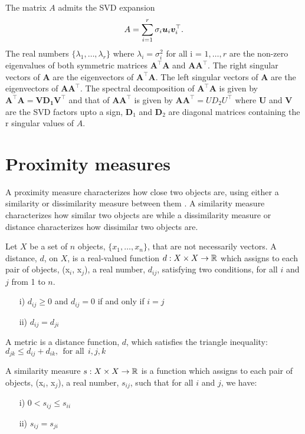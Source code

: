 The matrix $A$ admits the SVD expansion 
\[
A = \sum_{i=1}^{r} \sigma_{i} \boldsymbol{u}_{i} \boldsymbol{v}_{i}^{\top}.
\]
The real numbers $\{\lambda_{1}, \ldots, \lambda_{r}\}$ where $\lambda_{i} = \sigma_{i}^{2}$ for all i = $1 , \ldots, r$ are the non-zero eigenvalues of both symmetric matrices $\bm{A^{\top}A}$ and $\bm{AA^{\top}}.$ The right singular vectors of $\bm{A}$ are the eigenvectors of $\bm{A^{\top}A}.$ The left singular vectors of $\bm{A}$ are the eigenvectors of $\bm{AA^{\top}}.$ The spectral decomposition of $\bm{A^{\top}A}$ is given by $\bm{A^{\top}A  = V D_{1} V^{\top}}$ and that of  $\bm{AA^{\top}}$ is given by  $\bm{AA^{\top}} = U D_{2} U^{\top}$ where $\bm{U}$ and $\bm{V}$ are the SVD factors upto a sign, $\bm{D}_{1}$ and $\bm{D}_{2}$ are diagonal matrices containing the r singular values of $A$.


\section{Proximity measures}\label{proximity}

\begin{Def}
A proximity measure characterizes how close two objects are, using
either a similarity or dissimilarity measure between them \cite{CoxT2000}.
A similarity measure characterizes how similar two objects are while
a dissimilarity measure or distance characterizes how dissimilar two objects are.
\end{Def}


\begin{Def}\label{distance}
Let $X$ be a set of $n$ objects, $\{x_{1}, \dots, x_{n}\}$, that are not necessarily vectors. A distance, $d$, on $X$, is a real-valued  function
$d: X \times X \rightarrow  \operatorname{\mathbb{R}}$ which assigns to each pair of objects, (x$_{i}$, x$_{j}$), a real number, $d_{ij}$, satisfying two conditions, for all $i$ and $j$ from 1 to $n$. 
\begin{itemize}
\item [i)] $d_{ij} \geq 0$ and $d_{ij} = 0$ if and only if $i=j$
\item [ii)] $d_{ij} = d_{ji}$
\end{itemize}
\end{Def}


A metric is a distance function, $d$, which satisfies the triangle inequality:
$d_{jk} \leq d_{ij} + d_{ik}, \ \ \text{for all}\ \ i,j,k$ 


\begin{Def}
A similarity measure $s: X \times X \rightarrow  \operatorname{\mathbb{R}}$ is a function which assigns to each pair of objects, (x$_{i}$, x$_{j}$), a real number, $s_{ij}$, such that
for all $i$ and $j$, we have:
\begin{itemize}
\item [i)]   $0 < s_{ij} \leq s_{ii}$ 
\item [ii)]  $s_{ij} = s_{ji}$
\end{itemize}
\end{Def}

